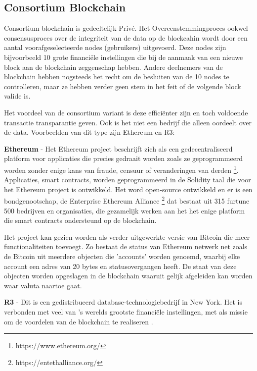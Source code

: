 \subsection{Consortium Blockchain}
Consortium blockchain is gedeeltelijk Privé. Het Overeenstemmingproces ookwel consensusproces over de integriteit van de data op de blockcahin wordt door een aantal voorafgeselecteerde nodes (gebruikers) uitgevoerd. Deze nodes zijn bijvoorbeeld 10 grote financiële instellingen die bij de aanmaak van een nieuwe block aan de blockchain zeggenschap hebben. Andere deelnemers van de blockchain hebben nogsteeds het recht om de besluiten van de 10 nodes te controlleren, maar ze hebben verder geen stem in het feit of de volgende block valide is.\par

Het voordeel van de consortium variant is deze efficiënter zijn en toch voldoende transactie transparantie geven. Ook is het niet een bedrijf die alleen oordeelt over de data. Voorbeelden van dit type zijn Ethereum en R3:

\textbf{Ethereum} - Het Ethereum project beschrijft zich als een gedecentraliseerd platform voor applicaties die precies gedraait worden zoals ze geprogrammeerd worden zonder enige kans van fraude, censuur of veranderingen van derden \footnote{https://www.ethereum.org/}. Applicaties, smart contracts, worden geprogrammeerd in de Solidity taal die voor het Ethereum project is ontwikkeld. Het word open-source ontwikkeld en er is een bondgenootschap, de Enterprise Ethereum Alliance \footnote{https://entethalliance.org/} dat bestaat uit 315 furtune 500 bedrijven en organisaties, die gezamelijk werken aan het het enige platform die smart contracts ondersteund op de blockchain.\cite{ethWood}\par

Het project kan gezien worden als verder uitgewerkte versie van Bitcoin die meer functionaliteiten toevoegt. Zo bestaat de status van Ethereum netwerk net zoals de Bitcoin uit meerdere objecten die 'accounts' worden genoemd, waarbij elke account een adres van 20 bytes en statusovergangen heeft. De staat van deze objecten worden opgeslagen in de blockchain waaruit gelijk afgeleiden kan worden waar valuta naartoe gaat.\cite{whitePaperEthereum}

\textbf{R3} - Dit is een gedistribueerd database-technologiebedrijf in New York. Het is verbonden met veel van 's werelds grootste financiële instellingen, met als missie om de voordelen van de blockchain te realiseren \cite{R3}.

